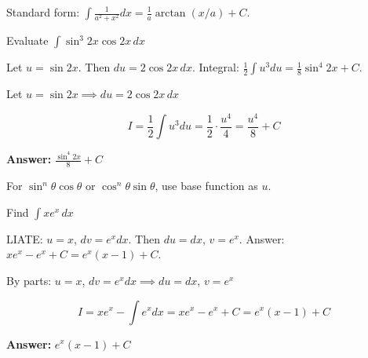 \begin{takeaways}
Standard form: $\int \frac{1}{a^2+x^2}dx = \frac{1}{a}\arctan(x/a) + C$.
\end{takeaways}

\vspace{1cm}

\begin{problem}
Evaluate $\displaystyle \int \sin^3 2x \cos 2x \, dx$
\end{problem}

\begin{hint}
Let $u = \sin 2x$. Then $du = 2\cos 2x \, dx$. Integral: $\frac{1}{2}\int u^3 du = \frac{1}{8}\sin^4 2x + C$.
\end{hint}

\begin{solution}
Let $u = \sin 2x \implies du = 2\cos 2x\,dx$

\[
I = \frac{1}{2}\int u^3 du = \frac{1}{2} \cdot \frac{u^4}{4} = \frac{u^4}{8} + C
\]

\textbf{Answer:} $\boxed{\frac{\sin^4 2x}{8} + C}$
\end{solution}

\begin{takeaways}
For $\sin^n\theta\cos\theta$ or $\cos^n\theta\sin\theta$, use base function as $u$.
\end{takeaways}

\vspace{1cm}

\begin{problem}
Find $\displaystyle \int x e^x \, dx$
\end{problem}

\begin{hint}
LIATE: $u = x$, $dv = e^x dx$. Then $du = dx$, $v = e^x$. Answer: $xe^x - e^x + C = e^x(x-1) + C$.
\end{hint}

\begin{solution}
By parts: $u=x$, $dv=e^x dx \implies du=dx$, $v=e^x$

\[
I = xe^x - \int e^x dx = xe^x - e^x + C = e^x(x-1) + C
\]

\textbf{Answer:} $\boxed{e^x(x-1) + C}$
\end{solution}

